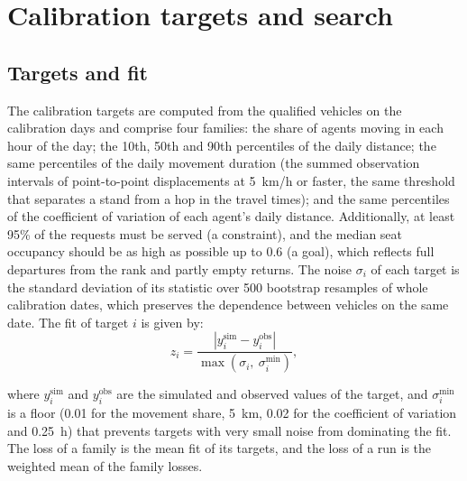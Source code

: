 \section{Calibration targets and search}
\label{app:calibration}

\subsection{Targets and fit}

The calibration targets are computed from the qualified vehicles on the calibration days and comprise four families: the share of agents moving in each hour of the day; the 10th, 50th and 90th percentiles of the daily distance; the same percentiles of the daily movement duration (the summed observation intervals of point-to-point displacements at 5~km/h or faster, the same threshold that separates a stand from a hop in the travel times); and the same percentiles of the coefficient of variation of each agent's daily distance. Additionally, at least 95\% of the requests must be served (a constraint), and the median seat occupancy should be as high as possible up to 0.6 (a goal), which reflects full departures from the rank and partly empty returns. The noise \( \sigma_i \) of each target is the standard deviation of its statistic over 500 bootstrap resamples of whole calibration dates, which preserves the dependence between vehicles on the same date. The fit of target \( i \) is given by:
\begin{equation}
    z_i = \frac{\left| y_i^{\text{sim}} - y_i^{\text{obs}} \right|}{\max\left(\sigma_i,\ \sigma_i^{\text{min}}\right)},
\end{equation}

\noindent where \( y_i^{\text{sim}} \) and \( y_i^{\text{obs}} \) are the simulated and observed values of the target, and \( \sigma_i^{\text{min}} \) is a floor (0.01 for the movement share, 5~km, 0.02 for the coefficient of variation and 0.25~h) that prevents targets with very small noise from dominating the fit. The loss of a family is the mean fit of its targets, and the loss of a run is the weighted mean of the family losses.

